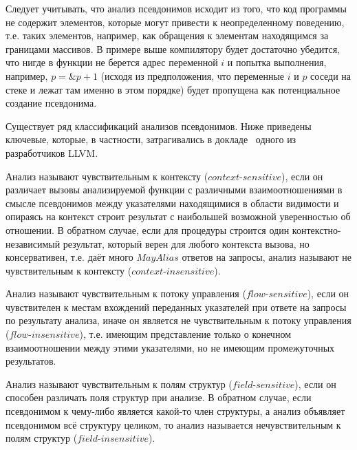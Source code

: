 \begin{myremark}
Следует учитывать, что анализ псевдонимов исходит из того, что код программы не содержит элементов, которые могут привести к неопределенному поведению, т.е. таких элементов, например, как обращения к элементам находящимся за границами массивов. В примере выше компилятору будет достаточно убедится, что нигде в функции не берется адрес переменной $i$ и попытка выполнения, например, $p = \&p + 1$ (исходя из предположения, что переменные $i$ и $p$ соседи на стеке и лежат там именно в этом порядке) будет пропущена как потенциальное создание псевдонима.
\end{myremark}


Существует ряд классификаций анализов псевдонимов. Ниже приведены ключевые, которые, в частности, затрагивались в докладе~\autocite{GohmanAAinLLVM} одного из разработчиков LLVM.

\begin{mydefinition}
Анализ называют чувствительным к контексту ($context$-$sensitive$), если он различает вызовы анализируемой функции с различными взаимоотношениями в смысле псевдонимов между указателями находящимися в области видимости и опираясь на контекст строит результат с наибольшей возможной уверенностью об отношении. В обратном случае, если для процедуры строится один контекстно-независимый результат, который верен для любого контекста вызова, но консервативен, т.е. даёт много $MayAlias$ ответов на запросы, анализ называют не чувствительным к контексту ($context$-$insensitive$).
\end{mydefinition}

\begin{mydefinition}
Анализ называют чувствительным к потоку управления ($flow$-$sensitive$), если он чувствителен к местам вхождений переданных указателей при ответе на запросы по результату анализа, иначе он является не чувствительным к потоку управления ($flow$-$insensitive$), т.е. имеющим представление только о конечном взаимоотношении между этими указателями, но не имеющим промежуточных результатов.
\end{mydefinition}

\begin{mydefinition}
Анализ называют чувствительным к полям структур ($field$-$sensitive$), если он способен различать поля структур при анализе. В обратном случае, если псевдонимом к чему-либо является какой-то член структуры, а анализ объявляет псевдонимом всё структуру целиком, то анализ называется нечувствительным к полям структур ($field$-$insensitive$).
\end{mydefinition}

